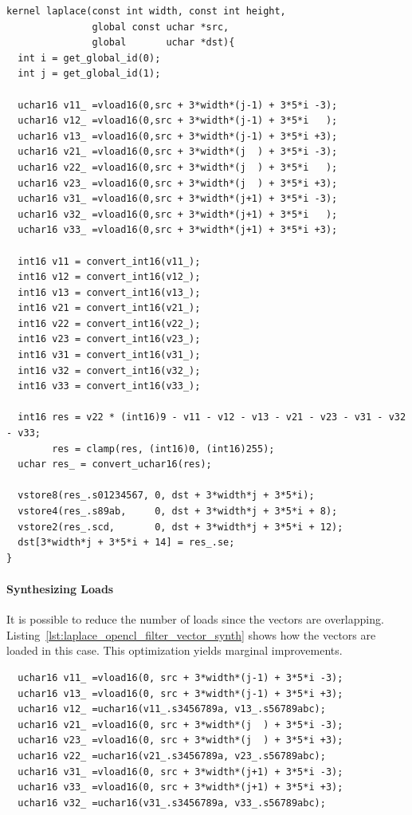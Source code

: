 \documentclass{IEEEtran}
\begin{document}
\begin{lstlisting}
kernel laplace(const int width, const int height,
               global const uchar *src,
               global       uchar *dst){
  int i = get_global_id(0);
  int j = get_global_id(1);

  uchar16 v11_ =vload16(0,src + 3*width*(j-1) + 3*5*i -3);
  uchar16 v12_ =vload16(0,src + 3*width*(j-1) + 3*5*i   );
  uchar16 v13_ =vload16(0,src + 3*width*(j-1) + 3*5*i +3);
  uchar16 v21_ =vload16(0,src + 3*width*(j  ) + 3*5*i -3);
  uchar16 v22_ =vload16(0,src + 3*width*(j  ) + 3*5*i   );
  uchar16 v23_ =vload16(0,src + 3*width*(j  ) + 3*5*i +3);
  uchar16 v31_ =vload16(0,src + 3*width*(j+1) + 3*5*i -3);
  uchar16 v32_ =vload16(0,src + 3*width*(j+1) + 3*5*i   );
  uchar16 v33_ =vload16(0,src + 3*width*(j+1) + 3*5*i +3);

  int16 v11 = convert_int16(v11_);
  int16 v12 = convert_int16(v12_);
  int16 v13 = convert_int16(v13_);
  int16 v21 = convert_int16(v21_);
  int16 v22 = convert_int16(v22_);
  int16 v23 = convert_int16(v23_);
  int16 v31 = convert_int16(v31_);
  int16 v32 = convert_int16(v32_);
  int16 v33 = convert_int16(v33_);

  int16 res = v22 * (int16)9 - v11 - v12 - v13 - v21 - v23 - v31 - v32 - v33;
        res = clamp(res, (int16)0, (int16)255);
  uchar res_ = convert_uchar16(res);

  vstore8(res_.s01234567, 0, dst + 3*width*j + 3*5*i);
  vstore4(res_.s89ab,     0, dst + 3*width*j + 3*5*i + 8);
  vstore2(res_.scd,       0, dst + 3*width*j + 3*5*i + 12);
  dst[3*width*j + 3*5*i + 14] = res_.se;
}
\end{lstlisting}

\paragraph{Synthesizing Loads} It is possible to reduce the number of loads
since the vectors are overlapping.
Listing~\ref{lst:laplace_opencl_filter_vector_synth} shows how the vectors are
loaded in this case. This optimization yields marginal improvements.

\begin{lstlisting}
  uchar16 v11_ =vload16(0, src + 3*width*(j-1) + 3*5*i -3);
  uchar16 v13_ =vload16(0, src + 3*width*(j-1) + 3*5*i +3);
  uchar16 v12_ =uchar16(v11_.s3456789a, v13_.s56789abc);
  uchar16 v21_ =vload16(0, src + 3*width*(j  ) + 3*5*i -3);
  uchar16 v23_ =vload16(0, src + 3*width*(j  ) + 3*5*i +3);
  uchar16 v22_ =uchar16(v21_.s3456789a, v23_.s56789abc);
  uchar16 v31_ =vload16(0, src + 3*width*(j+1) + 3*5*i -3);
  uchar16 v33_ =vload16(0, src + 3*width*(j+1) + 3*5*i +3);
  uchar16 v32_ =uchar16(v31_.s3456789a, v33_.s56789abc);
\end{lstlisting}
\end{document}
